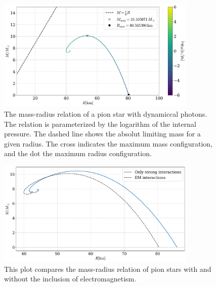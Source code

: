 \begin{figure}[!htb]
    \centering
    \includegraphics[width=0.85\textwidth]{../scripts/figurer/pion_star/mass_radius_pion_star_EM.pdf}
    \caption{The mass-radius relation of a pion star with dynamiccal photons. The relation is parameterized by the logarithm of the internal pressure. The dashed line shows the absolut limiting mass for a given radius. The cross indicates the maximum mass configuration, and the dot the maximum radius configuration.}
    \label{fig: mass-radius relation leading order pion star with em interaction}
\end{figure}


\begin{figure}[!htb]
    \centering
    \includegraphics[width=0.85\textwidth]{../scripts/figurer/pion_star/mass_radius_pion_star_compare.pdf}
    \caption{
        This plot compares the mass-radius relation of pion stars with and without the inclusion of electromagnetism.
        }
        \label{fig: mass-radius relation comparison}
\end{figure}

